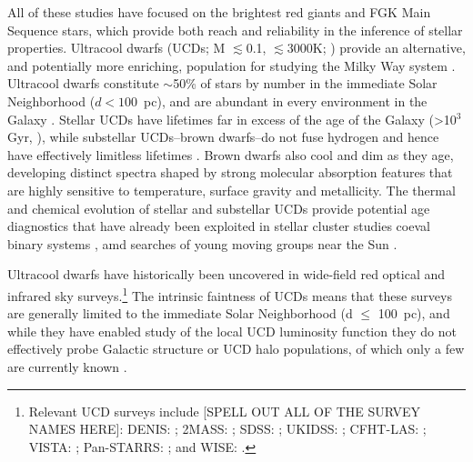 \documentclass[manuscript]{aastex63}
\begin{document}
All of these studies have focused on the brightest red giants and FGK Main Sequence stars, which provide both reach and reliability in the inference of stellar properties.
Ultracool dwarfs (UCDs; M $\lesssim$0.1\Msun, {\teff} $\lesssim$3000K; \citealt{2005ARA&A..43..195K}) provide an alternative, and potentially more enriching, population for studying the Milky Way system \citep{2004ApJS..155..191B,Ryan2017}. Ultracool dwarfs constitute $\sim$50\% of stars by number in the immediate Solar Neighborhood ($d < 100$~pc), and are abundant in every environment in the Galaxy \citep{1999ApJ...521..613R,2000ARA&A..38..337C,2007AJ....133..439C,2010AJ....139.2679B,2019ApJS..240...19K}. Stellar UCDs have lifetimes far in excess of the age of the Galaxy (\textgreater 10$^3$ Gyr, \citealt{1997ApJ...482..420L}), while substellar UCDs--brown dwarfs--do not fuse hydrogen and hence have effectively limitless lifetimes \citep{1962AJ.....67S.579K,1963ApJ...137.1121K,1963PThPh..30..460H}. Brown dwarfs also cool and dim as they age, developing distinct spectra shaped by strong molecular absorption features that are highly sensitive to temperature, surface gravity and metallicity. The thermal and chemical evolution of stellar and substellar UCDs provide potential age diagnostics that have already been exploited in stellar cluster studies \citep{1998ApJ...499L.199S,2005MNRAS.358...13J,2018ApJ...856...40M}
coeval binary systems \citep{2002ApJ...581L..43S,2009AJ....137.4621B}, 
amd searches of young moving groups near the Sun \citep{LopezSantiago2006,Gagne2015,Mamajek2015,Faherty2018}.

Ultracool dwarfs have historically been uncovered in wide-field red optical and infrared sky surveys.\footnote{Relevant UCD surveys include [SPELL OUT ALL OF THE SURVEY NAMES HERE]: 
DENIS: \citep{refId0,2003A&A...401..959P};
2MASS: \citep{2007AJ....133..439C, 2010ApJS..190..100K};
SDSS: \citep{2002AJ....123.3409H,2010AJ....139.1808S, 2014PASP..126..642S,2017AJ....153...92T};
UKIDSS: \citep{2013MNRAS.430.1171D,2013MNRAS.433..457B,Marocco01062015,2016A&A...589A..49S};
CFHT-LAS: \citep{Reyle2010a}; 
VISTA: \citep{2012A&A...548A..53L,2014MNRAS.444.1793D}; 
Pan-STARRS: \citep{2011ApJ...740L..32L, 2013ApJ...777...84B, 2015ApJ...814..118B}; and 
WISE: \citep{2011ApJS..197...19K, 2016ApJS..224...36K, 2016ApJ...817..112S}.}
The intrinsic faintness of UCDs means that these surveys are generally limited to the immediate Solar Neighborhood (d $\leq$ 100~pc), and while they have enabled study of the local UCD luminosity function \citep{2007AJ....133..439C, 2008ApJ...676.1281M, Reyle2010a,2019ApJ...883..205B,2019ApJS..240...19K} they do not effectively probe Galactic structure or UCD halo populations, of which only a few are currently known \citep{2003ApJ...592.1186B,2008ApJ...681L..33L,2019MNRAS.486.1260Z}.
\end{document}
